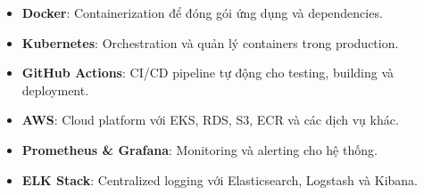 \begin{itemize}
    \item \textbf{Docker}: Containerization để đóng gói ứng dụng và dependencies.
    \item \textbf{Kubernetes}: Orchestration và quản lý containers trong production.
    \item \textbf{GitHub Actions}: CI/CD pipeline tự động cho testing, building và deployment.
    \item \textbf{AWS}: Cloud platform với EKS, RDS, S3, ECR và các dịch vụ khác.
    \item \textbf{Prometheus \& Grafana}: Monitoring và alerting cho hệ thống.
    \item \textbf{ELK Stack}: Centralized logging với Elasticsearch, Logstash và Kibana.
\end{itemize}

